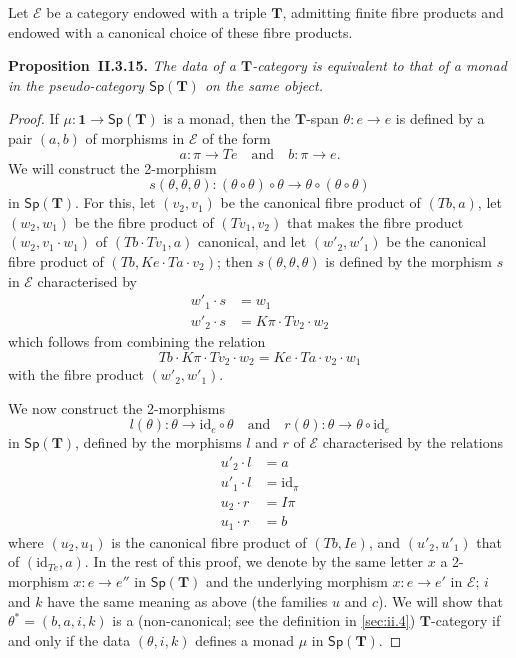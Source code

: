 \documentclass[fleqn]{article}
\newenvironment{itenv}[1]
  {\phantomsection\par\medskip\noindent\textbf{#1.}\itshape}
  {\par\medskip}
\newcommand{\oldpage}[1]{\marginpar{\footnotesize$\Big\vert$ \textit{p.~#1}}}
\newcommand{\id}{\mathrm{id}}
\newcommand{\TT}{\mathbf{T}}
\newcommand{\textand}{\quad\text{and}\quad}
\newcommand{\cat}[1]{\mathcal{#1}}
\newcommand{\Cat}[1]{\mathsf{#1}}
\newcommand{\Sp}[1]{\Cat{Sp}(#1)}
\begin{document}
\oldpage{258}
Let $\cat{E}$ be a category endowed with a triple $\TT$, admitting finite fibre products and endowed with a canonical choice of these fibre products.

\begin{itenv}{Proposition~II.3.15}
  The data of a $\TT$-category is equivalent to that of a monad in the pseudo-category $\Sp{\TT}$ on the same object.
\end{itenv}

\begin{proof}
  If $\mu\colon\mathbf{1}\to\Sp{\TT}$ is a monad, then the $\TT$-span $\theta\colon e\to e$ is defined by a pair $(a,b)$ of morphisms in $\cat{E}$ of the form
  \[
    a\colon\pi\to Te
    \textand
    b\colon\pi\to e.
  \]
  We will construct the 2-morphism
  \[
    s(\theta,\theta,\theta)\colon
    (\theta\circ\theta)\circ\theta
    \to \theta\circ(\theta\circ\theta)
  \]
  in $\Sp{\TT}$.
  For this, let $(v_2,v_1)$ be the canonical fibre product of $(Tb,a)$, let $(w_2,w_1)$ be the fibre product of $(Tv_1,v_2)$ that makes the fibre product $(w_2,v_1\cdot w_1)$ of $(Tb\cdot Tv_1,a)$ canonical, and let $(w'_2,w'_1)$ be the canonical fibre product of $(Tb,Ke\cdot Ta\cdot v_2)$;
  then $s(\theta,\theta,\theta)$ is defined by the morphism $s$ in $\cat{E}$ characterised by
  \[
    \begin{aligned}
      w'_1\cdot s
      &= w_1
    \\w'_2\cdot s
      &= K\pi\cdot Tv_2\cdot w_2
    \end{aligned}
    \tag{1}
  \]
  which follows from combining the relation
  \[
    Tb\cdot K\pi\cdot Tv_2\cdot w_2
    = Ke\cdot Ta\cdot v_2\cdot w_1
  \]
  with the fibre product $(w'_2,w'_1)$.

  We now construct the 2-morphisms
  \[
    l(\theta)\colon\theta\to\id_e\circ\theta
    \textand
    r(\theta)\colon\theta\to\theta\circ\id_e
  \]
  in $\Sp{\TT}$, defined by the morphisms $l$ and $r$ of $\cat{E}$ characterised by the relations
  \[
    \begin{aligned}
      u'_2\cdot l
      &= a
    \\u'_1\cdot l
      &= \id_\pi
    \\u_2\cdot r
      &= I\pi
    \\u_1\cdot r
      &= b
    \end{aligned}
    \tag{2}
  \]
  where $(u_2,u_1)$ is the canonical fibre product of $(Tb,Ie)$, and $(u'_2,u'_1)$ that of $(\id_{Te},a)$.
  \oldpage{259}
  In the rest of this proof, we denote by the same letter $x$ a 2-morphism $x\colon e\to e''$ in $\Sp{\TT}$ and the underlying morphism $x\colon e\to e'$ in $\cat{E}$; $i$ and $k$ have the same meaning as above (the families $u$ and $c$).
  We will show that $\theta^*=(b,a,i,k)$ is a (non-canonical; see the definition in \cref{sec:ii.4}) $\TT$-category if and only if the data $(\theta,i,k)$ defines a monad $\mu$ in $\Sp{\TT}$.


\end{proof}
\end{document}
